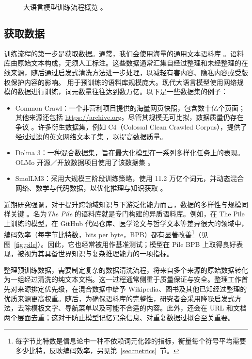 \begin{figure}
    \centering
    
    \caption{大语言模型训练流程概览 \citep{radford2019language,minaee2024large}。}
    \label{fig:llm-training-pipeline}
\end{figure}

\subsection{获取数据}
训练流程的第一步是获取数据。通常，我们会使用海量的通用文本语料库 \citep{brown2020language}。语料库由原始文本构成，无须人工标注。这些数据通常汇集自经过整理和未经整理的在线来源，随后通过启发式清洗方法进一步处理，以减轻有害内容、隐私内容或受版权保护内容的影响。
用于预训练的语料库规模庞大。现代大语言模型使用网络规模的数据进行训练，词元数量往往达到数万亿。以下是一些数据集的例子：

\begin{itemize}
    \item Common Crawl：一个非营利项目提供的海量网页快照，包含数十亿个页面；其他来源还包括 \url{https://archive.org}。尽管其规模无可比拟，数据质量仍存在争议 \citep{baack2024critical}。许多衍生数据集，例如 C4（Colossal Clean Crawled Corpus），提供了经过过滤的英文网络文本子集 \citep{raffel2020exploringc4}，以提高数据质量。
    \item Dolma 3：一种混合数据集，旨在最大化模型在一系列多样化任务上的表现。OLMo 开源／开放数据项目使用了该数据集 \citep{olmo2025olmo3, soldaini2024dolma}。
    \item SmolLM3：采用大规模三阶段训练策略，使用 11.2 万亿个词元，并动态混合网络、数学与代码数据，以优化推理与知识获取 \citep{bakouch2025smollm3}。
\end{itemize}
近期研究强调，对于提升跨领域知识与下游泛化能力而言，数据的多样性与规模同样关键 \citep{gao2020pile800gbdatasetdiverse}。名为{\em The Pile} 的语料库就是专门构建的异质语料库。例如，在 The Pile 上训练的模型，在 GitHub 代码仓库、医学论文与哲学文本等差异很大的领域中，编码效率（每字节比特数，bits per byte，BPB）都有显著改善\footnote{每字节比特数是信息论中一种不依赖词元化器的指标，衡量每个符号平均需要多少比特，反映编码效率，另见第~\ref{sec:metrics}~节。}（见图~\ref{fig:pile}）。因此，它也经常被用作基准测试；模型在 Pile BPB 上取得良好表现，被视为其具备世界知识与复杂推理能力的一项指标。

整理预训练数据，需要制定复杂的数据清洗流程，将来自多个来源的原始数据转化为一组经过清洗的纯文本文档。这一过程通常侧重于质量保证与安全。整理工作首先对来源排定优先级，在混合数据中给予 Wikipedia、图书及其他已知经过整理的优质来源更高权重。随后，为确保语料库的完整性，研究者会采用降噪启发式方法，去除模板文字、导航菜单以及可能不合适的内容。此外，还会在 URL 和文档两个层面去重；这对于防止模型记忆冗余信息、对重复数据过拟合至关重要。

